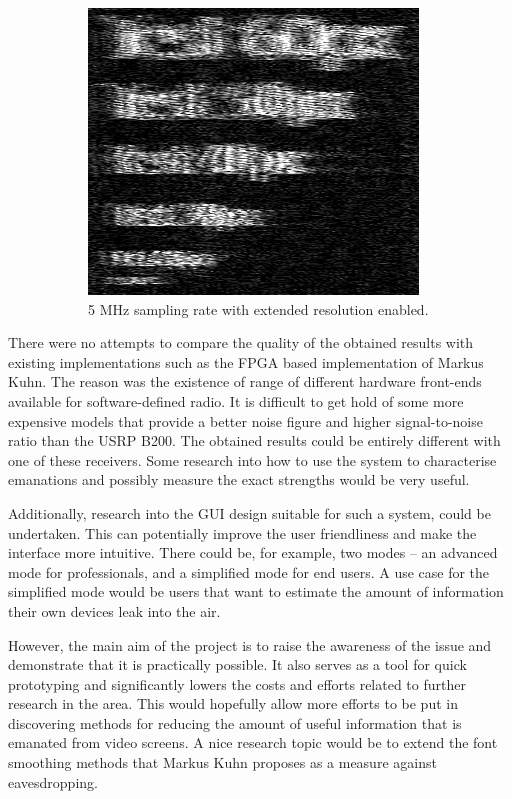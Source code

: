 \documentclass[a4paper,12pt,twoside,openright]{report}
\begin{document}
\begin{figure}[h!]
\begin{subfigure}[t]{0.3\textwidth}
  \includegraphics[width=\textwidth]{sup_res_on}
  \caption{5 MHz sampling rate with extended resolution enabled.}
\end{subfigure}
  \caption{}
  \label{fig:superresolution}
\end{figure}

There were no attempts to compare the quality of the obtained results with existing implementations such as the FPGA based implementation of Markus Kuhn. The reason was the existence of range of different hardware front-ends available for software-defined radio. It is difficult to get hold of some more expensive models that provide a better noise figure and higher signal-to-noise ratio than the USRP B200. The obtained results could be entirely different with one of these receivers. Some research into how to use the system to characterise emanations and possibly measure the exact strengths would be very useful.

Additionally, research into the GUI design suitable for such a system, could be undertaken. This can potentially improve the user friendliness and make the interface more intuitive. There could be, for example, two modes -- an advanced mode for professionals, and a simplified mode for end users. A use case for the simplified mode would be users that want to estimate the amount of information their own devices leak into the air.

However, the main aim of the project is to raise the awareness of the issue and demonstrate that it is practically possible. It also serves as a tool for quick prototyping and significantly lowers the costs and efforts related to further research in the area. This would hopefully allow more efforts to be put in discovering methods for reducing the amount of useful information that is emanated from video screens. A nice research topic would be to extend the font smoothing methods that Markus Kuhn proposes \cite{kuhn2003compromising} as a measure against eavesdropping.
\end{document}
